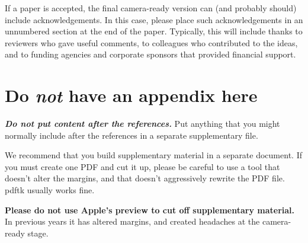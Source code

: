 If a paper is accepted, the final camera-ready version can (and
probably should) include acknowledgements. In this case, please
place such acknowledgements in an unnumbered section at the
end of the paper. Typically, this will include thanks to reviewers
who gave useful comments, to colleagues who contributed to the ideas,
and to funding agencies and corporate sponsors that provided financial
support.


\nocite{langley00}





\appendix
\section{Do \emph{not} have an appendix here}

\textbf{\emph{Do not put content after the references.}}
%
Put anything that you might normally include after the references in a separate
supplementary file.

We recommend that you build supplementary material in a separate document.
If you must create one PDF and cut it up, please be careful to use a tool that
doesn't alter the margins, and that doesn't aggressively rewrite the PDF file.
pdftk usually works fine. 

\textbf{Please do not use Apple's preview to cut off supplementary material.} In
previous years it has altered margins, and created headaches at the camera-ready
stage. 
